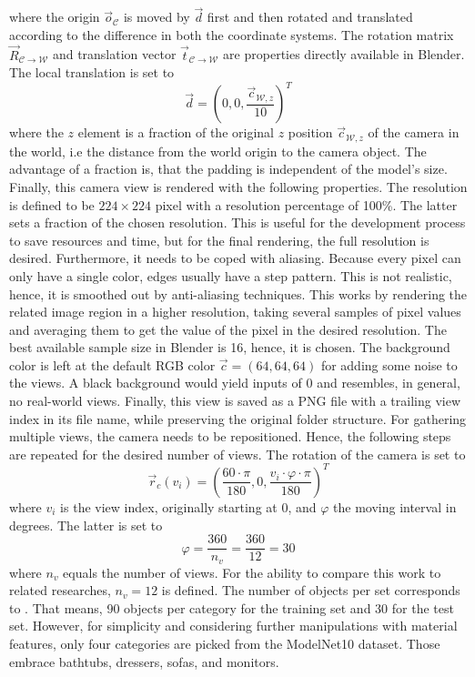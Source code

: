 where the origin $\vec{o}_{\mathcal{C}}$ is moved by $\vec{d}$ first and then rotated and translated according to the difference in both the coordinate systems.
The rotation matrix $\vec{R}_{\mathcal{C} \rightarrow \mathcal{W}}$ and translation vector $\vec{t}_{\mathcal{C} \rightarrow \mathcal{W}}$ are properties directly available in Blender.
The local translation is set to
\begin{equation}
	\vec{d} = \left( 0, 0, \frac{\vec{c}_{\mathcal{W}, z}}{10} \right)^T
\end{equation}
where the $z$ element is a fraction of the original $z$ position $\vec{c}_{\mathcal{W}, z}$ of the camera in the world, i.e the distance from the world origin to the camera object.
The advantage of a fraction is, that the padding is independent of the model's size.
Finally, this camera view is rendered with the following properties.
The resolution is defined to be $224 \times 224$ pixel with a resolution percentage of 100\%.
The latter sets a fraction of the chosen resolution.
This is useful for the development process to save resources and time, but for the final rendering, the full resolution is desired.
Furthermore, it needs to be coped with aliasing.
Because every pixel can only have a single color, edges usually have a step pattern.
This is not realistic, hence, it is smoothed out by anti-aliasing techniques.
This works by rendering the related image region in a higher resolution, taking several samples of pixel values and averaging them to get the value of the pixel in the desired resolution.
The best available sample size in Blender is 16, hence, it is chosen.
The background color is left at the default RGB color $\vec{c} = (64, 64, 64)$ for adding some noise to the views.
A black background would yield inputs of 0 and resembles, in general, no real-world views.
Finally, this view is saved as a PNG file with a trailing view index in its file name, while preserving the original folder structure.
For gathering multiple views, the camera needs to be repositioned.
Hence, the following steps are repeated for the desired number of views.
The rotation of the camera is set to
\begin{equation}
	\vec{r}_c(v_i) = \left(  \frac{60 \cdot \pi}{180}, 0, \frac{v_i \cdot \varphi \cdot \pi}{180} \right)^T
\end{equation}
where $v_i$ is the view index, originally starting at 0, and $\varphi$ the moving interval in degrees.
The latter is set to
\begin{equation}
	\varphi = \frac{360}{n_v} = \frac{360}{12} = 30
\end{equation}
where $n_v$ equals the number of views.
For the ability to compare this work to related researches, $n_v = 12$ is defined.
The number of objects per set corresponds to \cite{Su:2015:MCN:2919332.2919750}.
That means, 90 objects per category for the training set and 30 for the test set.
However, for simplicity and considering further manipulations with material features, only four categories are picked from the ModelNet10 dataset.
Those embrace bathtubs, dressers, sofas, and monitors.